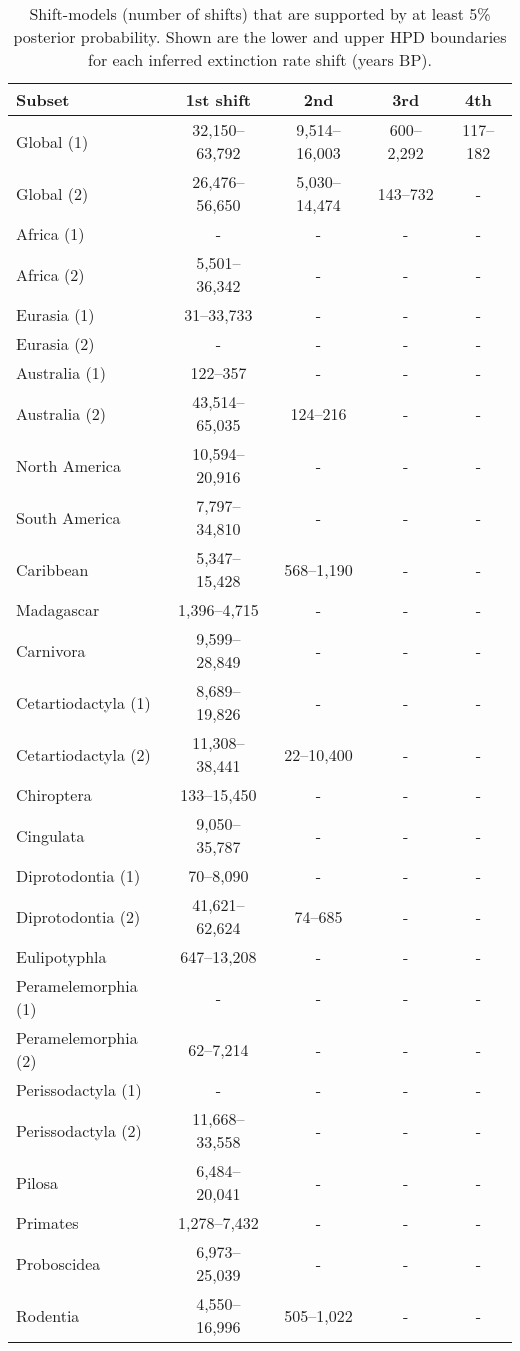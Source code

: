 \begin{table}
	\centering
	\caption{Shift-models (number of shifts) that are supported by at least 5\% posterior probability. Shown are the lower and upper HPD boundaries for each inferred extinction rate shift (years BP).}
	\begin{tabular}{lcccc}
	\hline
	 Subset & 1st shift & 2nd & 3rd & 4th \\
	\hline
	\hline
	 Global (1) & 32,150--63,792 &  9,514--16,003 &  600--2,292 &  117--182 \\
	 Global (2) & 26,476--56,650 &  5,030--14,474 &   143--732 &        - \\
	\hline
	 Africa (1) & - & - & - & - \\
	 Africa (2) & 5,501--36,342 & - & - & - \\
	 Eurasia (1) & 31--33,733 & - & - & - \\
	 Eurasia (2) & - & - & - & - \\
	 Australia (1) & 122--357 & - & - & - \\
	 Australia (2) & 43,514--65,035 &     124--216 & - & - \\
	 North America & 10,594--20,916 & - & - & - \\
	 South America & 7,797--34,810 & - & - & - \\
	 Caribbean & 5,347--15,428 &    568--1,190 & - & - \\
	 Madagascar & 1,396--4,715 & - & - & - \\
	\hline
	 Carnivora & 9,599--28,849 & - & - & - \\
	 Cetartiodactyla (1) & 8,689--19,826 & - & - & - \\
	 Cetartiodactyla (2) & 11,308--38,441 &    22--10,400 & - & - \\
	 Chiroptera & 133--15,450 & - & - & - \\
	 Cingulata & 9,050--35,787 & - & - & - \\
	 Diprotodontia (1) & 70--8,090 & - & - & - \\
	 Diprotodontia (2) & 41,621--62,624 &      74--685 & - & - \\
	 Eulipotyphla & 647--13,208 & - & - & - \\
	 Peramelemorphia (1) & - & - & - & - \\
	 Peramelemorphia (2) & 62--7,214  & - & - & - \\
	 Perissodactyla (1) & - & - & - & - \\
	 Perissodactyla (2) & 11,668--33,558 & - & - & - \\
	 Pilosa & 6,484--20,041 & - & - & - \\
	 Primates & 1,278--7,432 & - & - & - \\
	 Proboscidea & 6,973--25,039  & - & - & - \\
	 Rodentia & 4,550--16,996 &    505--1,022 & - & - \\
	\hline
	\end{tabular}
	\end{table}